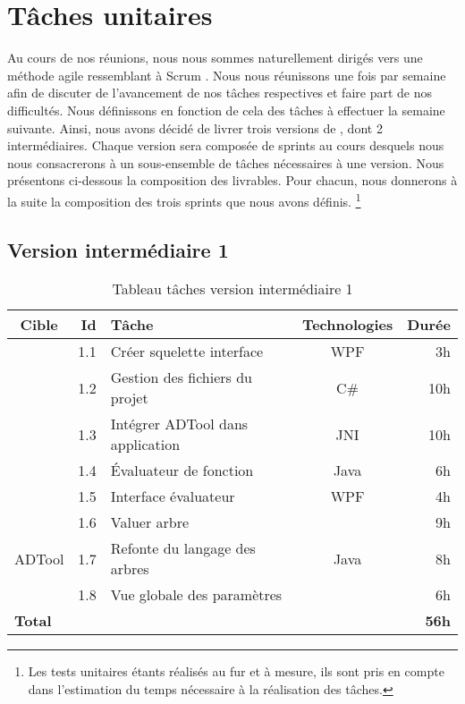 \section{Tâches unitaires}
	\label{sec:taches_unitaires}

	Au cours de nos réunions, nous nous sommes naturellement dirigés vers une méthode agile ressemblant à \og Scrum \fg. Nous nous réunissons une fois par semaine afin de discuter de l'avancement de nos tâches respectives et faire part de nos difficultés. Nous définissons en fonction de cela des tâches à effectuer la semaine suivante. Ainsi, nous avons décidé de livrer trois versions de \glasir{}, dont 2 intermédiaires.
	Chaque version sera composée de sprints au cours desquels nous nous consacrerons à un sous-ensemble de tâches nécessaires à une version. %
	Nous présentons ci-dessous la composition des livrables. Pour chacun, nous donnerons à la suite la composition des trois sprints que nous avons définis.
	\footnote{Les tests unitaires étants réalisés au fur et à mesure, ils sont pris en compte dans l'estimation du temps nécessaire à la réalisation des tâches.}

	\subsection{Version intermédiaire 1}

		\begin{table}[h]
			\centering
			\begin{tabular}{|c|r|l|c|r|}
				\hline
				\textbf{Cible} & \textbf{Id} & \textbf{Tâche} & \textbf{Technologies} & \textbf{Durée}\\
				\hline

				\multirow{5}{*}{\glasir{}} & 1.1 & Créer squelette interface & WPF & 3h\\
				\cline{2-5}
				 & 1.2 & Gestion des fichiers du projet & C\# & 10h\\
				\cline{2-5}
				 & 1.3 & Intégrer ADTool dans application & JNI & 10h\\
				\cline{2-5}
				 & 1.4 & \'Evaluateur de fonction & Java & 6h\\
				\cline{2-5}
				 & 1.5 & Interface évaluateur & WPF & 4h\\
				\hline

				\multirow{3}{*}{ADTool} & 1.6 & Valuer arbre & \multirow{3}{*}{Java} & 9h\\
				\cline{2-3} \cline{5-5}
				 & 1.7 & Refonte du langage des arbres & & 8h\\
				\cline{2-3} \cline{5-5}
				 & 1.8 & Vue globale des paramètres & & 6h\\
				\hline

				\multicolumn{4}{|l|}{\bf Total} & {\bf 56h}\\
				\hline
			\end{tabular}
			\caption{Tableau tâches version intermédiaire 1}
			\label{fig:taches_units_1}
		\end{table}

